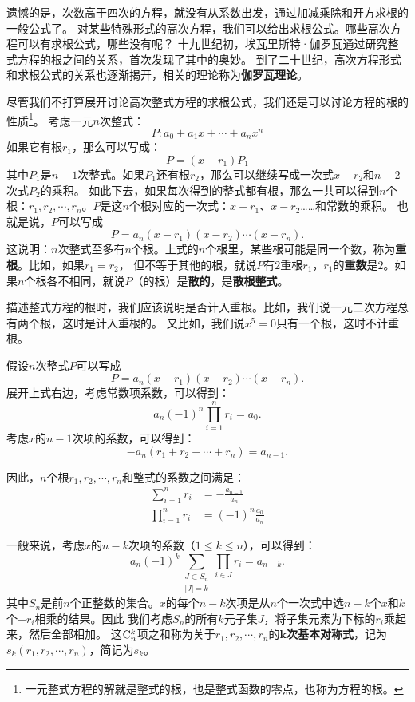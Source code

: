 \documentclass[12pt,UTF8]{ctexbook}
\begin{document}
遗憾的是，次数高于四次的方程，就没有从系数出发，通过加减乘除和开方求根的一般公式了。
对某些特殊形式的高次方程，我们可以给出求根公式。哪些高次方程可以有求根公式，哪些没有呢？
十九世纪初，埃瓦里斯特·伽罗瓦通过研究整式方程的根之间的关系，首次发现了其中的奥妙。
到了二十世纪，高次方程形式和求根公式的关系也逐渐揭开，相关的理论称为\textbf{伽罗瓦理论}。

尽管我们不打算展开讨论高次整式方程的求根公式，我们还是可以讨论方程的根的性质\footnote{一元整式方程的解就是整式的根，也是整式函数的零点，也称为方程的根。}。
考虑一元$n$次整式：
$$ P: a_0 + a_1 x + \cdots + a_n x^n $$
如果它有根$r_1$，那么可以写成：
$$ P = (x - r_1) P_1$$
其中$P_1$是$n-1$次整式。如果$P_1$还有根$r_2$，那么可以继续写成一次式$x - r_2$和$n-2$次式$P_2$的乘积。
如此下去，如果每次得到的整式都有根，那么一共可以得到$n$个根：$r_1, r_2, \cdots , r_n$。$P$是这$n$个根对应的一次式：$x - r_1$、$x - r_2$……和常数的乘积。
也就是说，$P$可以写成
$$ P = a_n (x - r_1)(x - r_2)\cdots (x - r_n).$$
这说明：$n$次整式至多有$n$个根。上式的$n$个根里，某些根可能是同一个数，称为\textbf{重根}。比如，如果$r_1 = r_2$，
但不等于其他的根，就说$P$有$2$\dash 重根$r_1$，$r_1$的\textbf{重数}是$2$。如果$n$个根各不相同，就说$P$（的根）是\textbf{散的}，是\textbf{散根整式}。

描述整式方程的根时，我们应该说明是否计入重根。比如，我们说一元二次方程总有两个根，这时是计入重根的。
又比如，我们说$x^5 = 0$只有一个根，这时不计重根。

假设$n$次整式$P$可以写成
$$ P = a_n (x - r_1)(x - r_2)\cdots (x - r_n).$$
展开上式右边，考虑常数项系数，可以得到：
$$ a_n (-1)^n \prod_{i=1}^n r_i = a_0.$$
考虑$x$的$n-1$次项的系数，可以得到：
$$ - a_n (r_1 + r_2 + \cdots + r_n) = a_{n-1}. $$

因此，$n$个根$r_1, r_2, \cdots , r_n$和整式的系数之间满足：
\begin{align*}
    \sum_{i=1}^n r_i &= -\frac{a_{n-1}}{a_n} \\
    \prod_{i=1}^n r_i &= (-1)^n \frac{a_0}{a_n}
\end{align*}

一般来说，考虑$x$的$n-k$次项的系数（$1\leqslant k \leqslant n$），可以得到：
$$ a_n (-1)^k \sum_{\substack{J\subset S_n\\|J|=k}} \prod_{i\in J}r_{i} = a_{n-k}. $$
其中$S_n$是前$n$个正整数的集合。$x$的每个$n-k$次项是从$n$个一次式中选$n-k$个$x$和$k$个$-r_i$相乘的结果。因此
我们考虑$S_n$的所有$k$元子集$J$，将子集元素为下标的$r_i$乘起来，然后全部相加。
这$\mathrm{C}_{n}^{k}$项之和称为关于$r_1, r_2, \cdots , r_n$的$\boldsymbol{k}$\textbf{次基本对称式}，记为$s_{k}(r_1, r_2, \cdots , r_n)$，简记为$s_k$。
\end{document}
